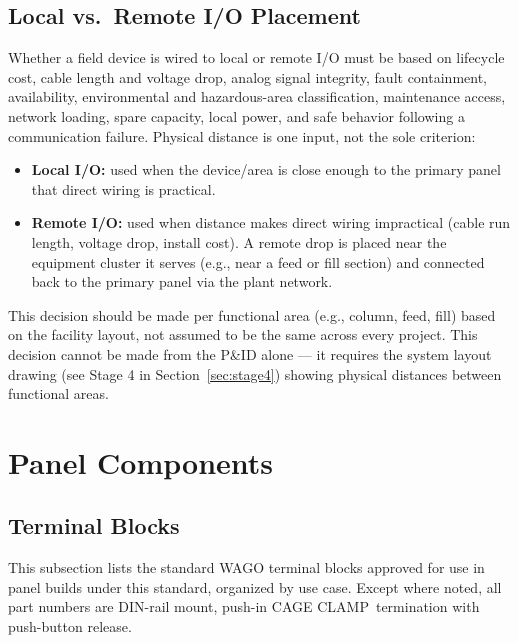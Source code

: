 \subsection{Local vs.\ Remote I/O Placement}\label{sec:local-remote-io}
Whether a field device is wired to local or remote I/O must be based on lifecycle cost, cable length and voltage drop, analog signal integrity, fault containment, availability, environmental and hazardous-area classification, maintenance access, network loading, spare capacity, local power, and safe behavior following a communication failure. Physical distance is one input, not the sole criterion:
\begin{itemize}[itemsep=2pt]
  \item \textbf{Local I/O:} used when the device/area is close enough to the primary panel that direct wiring is practical.
  \item \textbf{Remote I/O:} used when distance makes direct wiring impractical (cable run length, voltage drop, install cost). A remote drop is placed near the equipment cluster it serves (e.g., near a feed or fill section) and connected back to the primary panel via the plant network.
\end{itemize}
This decision should be made per functional area (e.g., column, feed, fill) based on the facility layout, not assumed to be the same across every project. This decision cannot be made from the P\&ID alone --- it requires the system layout drawing (see Stage 4 in Section~\ref{sec:stage4}) showing physical distances between functional areas.

\section{Panel Components}
\subsection{Terminal Blocks}
This subsection lists the standard WAGO terminal blocks approved for use in panel builds under this standard, organized by use case. Except where noted, all part numbers are DIN-rail mount, push-in CAGE CLAMP\textregistered\ termination with push-button release.

